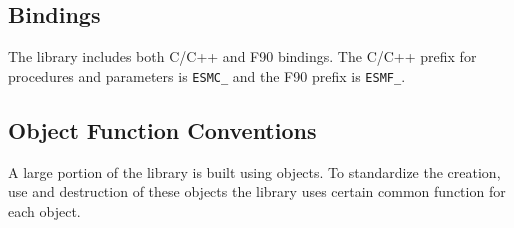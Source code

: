 
\subsection{Bindings}

The library includes both C/C++ and F90 bindings.  The C/C++ prefix
for procedures and parameters is {\tt ESMC\_} and the F90 prefix is
{\tt ESMF\_}.

\subsection{Object Function Conventions}

A large portion of the library is built using objects.  To standardize
the creation, use and destruction of these objects the library uses
certain common function for each object.

